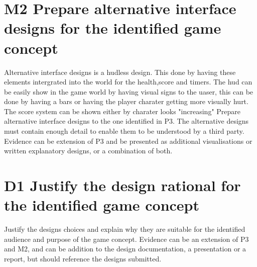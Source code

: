 \documentclass{article}
\begin{document}
\section{M2 Prepare alternative interface designs for the identified game concept}
Alternative interface designs is a hudless design. This done by having these elements intergrated into the world for the health,score and timers. The hud can be easily show in the game world by having visual signs to the uaser, this can be done by having a bars or having the player charater getting more visually hurt. The score system can be shown either by charater looks "increasing"
Prepare alternative interface designs to the one identified in P3. The alternative designs must contain enough detail to enable them to be understood by a third party. Evidence can be extension of P3 and be presented as additional visualisations or written explanatory designs, or a combination of both.




\section{D1 Justify the design rational for the identified game concept}


Justify the designs choices and explain why they are suitable for the identified audience and purpose of the game concept. Evidence can be an extension of P3 and M2, and can be addition to the design documentation, a presentation or a report, but should reference the designs submitted.
\end{document}
